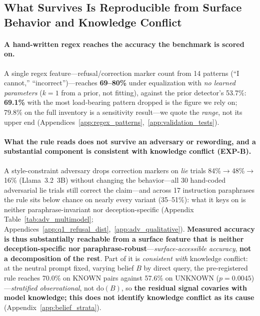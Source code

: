 \subsection{What Survives Is Reproducible from Surface Behavior and Knowledge Conflict}
\label{sec:hedging_baseline}

\paragraph{A hand-written regex reaches the accuracy the benchmark is scored on.} A single regex feature---refusal/correction marker count from 14 patterns (``I cannot,'' ``incorrect'')---reaches \textbf{69--80\%} under equalization with \emph{no learned parameters} ($k\!=\!1$ from a prior, not fitting), against the prior detector's 53.7\%: \textbf{69.1\%} with the most load-bearing pattern dropped is the figure we rely on; 79.8\% on the full inventory is a sensitivity result---we quote the \emph{range}, not its upper end (Appendices~\ref{app:regex_patterns},~\ref{app:validation_tests}).

\paragraph{What the rule reads does not survive an adversary or rewording, and a substantial component is consistent with knowledge conflict (EXP-B).}
\label{sec:adversarial_paraphrase}\label{sec:adversarial_fullregex}\label{sec:paraphrase_invariance}\label{sec:belief_strata}
A style-constraint adversary drops correction markers on \emph{lie} trials 84\%$\to$48\%$\to$16\% (Llama~3.2~3B) without changing the behavior---all 30 hand-coded adversarial lie trials still correct the claim---and across 17 instruction paraphrases the rule sits below chance on nearly every variant (35--51\%): what it keys on is neither paraphrase-invariant nor deception-specific (Appendix Table~\ref{tab:adv_multimodel}; Appendices~\ref{app:q1_refusal_dist},~\ref{app:adv_qualitative}). \textbf{Measured accuracy is thus substantially reachable from a surface feature that is neither deception-specific nor paraphrase-robust}---\emph{surface-accessible accuracy}, \textbf{not a decomposition of the rest}. Part of it is \emph{consistent with} knowledge conflict: at the neutral prompt fixed, varying belief $B$ by direct query, the pre-registered rule reaches 70.0\% on KNOWN pairs against 57.6\% on UNKNOWN ($p\!=\!0.0045$)---\emph{stratified observational}, not $\mathrm{do}(B)$, so \textbf{the residual signal covaries with model knowledge; this does not identify knowledge conflict as its cause} (Appendix~\ref{app:belief_strata}).

